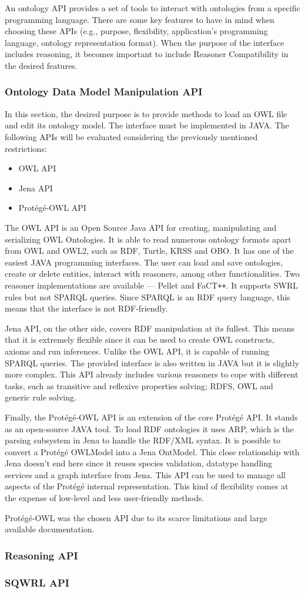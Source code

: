 An ontology API provides a set of tools to interact with ontologies from a specific programming language. There are some key features to have in mind when choosing these APIs (e.g., purpose, flexibility, application's programming language, ontology representation format). When the purpose of the interface includes reasoning, it becomes important to include Reasoner Compatibility in the desired features.

\subsubsection{Ontology Data Model Manipulation API}

In this section, the desired purpose is to provide methods to load an OWL file and edit its ontology model. The interface must be implemented in JAVA. The following APIs will be evaluated considering the previously mentioned restrictions:
\begin{itemize}
	\item OWL API
	\item Jena API
	\item Protégé-OWL API
\end{itemize}

The OWL API is an Open Source Java API for creating, manipulating and serializing OWL Ontologies. It is able to read numerous ontology formats apart from OWL and OWL2, such as RDF, Turtle, KRSS and OBO. It has one of the easiest JAVA programming interfaces. The user can load and save ontologies, create or delete entities, interact with reasoners, among other functionalities. Two reasoner implementations are available --- Pellet and FaCT\texttt{+}\texttt{+}. It supports SWRL rules but not SPARQL queries. Since SPARQL is an RDF query language, this means that the interface is not RDF-friendly.

Jena API, on the other side, covers RDF manipulation at its fullest. This means that it is extremely flexible since it can be used to create OWL constructs, axioms and run inferences. Unlike the OWL API, it is capable of running SPARQL queries. The provided interface is also written in JAVA but it is slightly more complex. This API already includes various reasoners to cope with different tasks, such as transitive and reflexive properties solving; RDFS, OWL and generic rule solving.

Finally, the Protégé-OWL API is an extension of the core Protégé API. It stands as an open-source JAVA tool. To load RDF ontologies it uses ARP, which is the parsing subsystem in Jena to handle the RDF/XML syntax. It is possible to convert a Protégé OWLModel into a Jena OntModel. This close relationship with Jena doesn't end here since it reuses species validation, datatype handling services and a graph interface from Jena. This API can be used  to manage all aspects of the Protégé internal representation. This kind of flexibility comes at the expense of low-level and less user-friendly methods.

Protégé-OWL was the chosen API due to its scarce limitations and large available documentation.

\subsubsection{Reasoning API}

\subsubsection{SQWRL API}